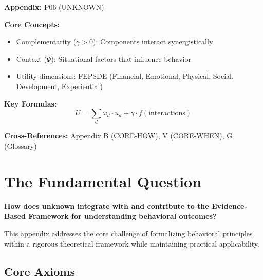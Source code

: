 \begin{tcolorbox}[colback=blue!5!white, colframe=blue!75!black,
    title=Quick Reference: Unknown]

\textbf{Appendix:} P06 (UNKNOWN)

\textbf{Core Concepts:}
\begin{itemize}[nosep]
\item Complementarity ($\gamma > 0$): Components interact synergistically
\item Context ($\Psi$): Situational factors that influence behavior
\item Utility dimensions: FEPSDE (Financial, Emotional, Physical, Social, Development, Experiential)
\end{itemize}

\textbf{Key Formulas:}
\begin{equation}
U = \sum_d \omega_d \cdot u_d + \gamma \cdot f(\text{interactions})
\end{equation}

\textbf{Cross-References:} Appendix B (CORE-HOW), V (CORE-WHEN), G (Glossary)
\end{tcolorbox}

\section{The Fundamental Question}
\label{sec:p06-fundamental}

\begin{tcolorbox}[
    colback=red!5!white,
    colframe=red!75!black,
    title={\textbf{Fundamental Question}}
]
\textbf{How does unknown integrate with and contribute to the
Evidence-Based Framework for understanding behavioral outcomes?}

This appendix addresses the core challenge of formalizing behavioral principles
within a rigorous theoretical framework while maintaining practical applicability.
\end{tcolorbox}


\subsection{Core Axioms}
\label{sec:p06-axioms}

